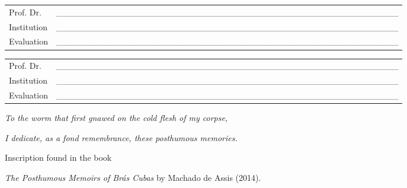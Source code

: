 \begin{folhadeaprovacao}
  \vspace*{0.5cm}

  \noindent
  \begin{tabular}{m{2cm} P{14cm}}
    Prof. Dr. & \_\_\_\_\_\_\_\_\_\_\_\_\_\_\_\_\_\_\_\_\_\_\_\_\_\_\_\_\_\_\_\_\_\_\_\_\_\_\_\_\_\_\_\_\_\_\_\_\_\_\_\_\_\_\_ \\
    Institution & \_\_\_\_\_\_\_\_\_\_\_\_\_\_\_\_\_\_\_\_\_\_\_\_\_\_\_\_\_\_\_\_\_\_\_\_\_\_\_\_\_\_\_\_\_\_\_\_\_\_\_\_\_\_\_ \\
    Evaluation & \_\_\_\_\_\_\_\_\_\_\_\_\_\_\_\_\_\_\_\_\_\_\_\_\_\_\_\_\_\_\_\_\_\_\_\_\_\_\_\_\_\_\_\_\_\_\_\_\_\_\_\_\_\_\_ \\
  \end{tabular}

  \vspace*{0.5cm}

  \noindent
  \begin{tabular}{m{2cm} P{14cm}}
    Prof. Dr. & \_\_\_\_\_\_\_\_\_\_\_\_\_\_\_\_\_\_\_\_\_\_\_\_\_\_\_\_\_\_\_\_\_\_\_\_\_\_\_\_\_\_\_\_\_\_\_\_\_\_\_\_\_\_\_ \\
    Institution & \_\_\_\_\_\_\_\_\_\_\_\_\_\_\_\_\_\_\_\_\_\_\_\_\_\_\_\_\_\_\_\_\_\_\_\_\_\_\_\_\_\_\_\_\_\_\_\_\_\_\_\_\_\_\_ \\
    Evaluation & \_\_\_\_\_\_\_\_\_\_\_\_\_\_\_\_\_\_\_\_\_\_\_\_\_\_\_\_\_\_\_\_\_\_\_\_\_\_\_\_\_\_\_\_\_\_\_\_\_\_\_\_\_\_\_ \\
  \end{tabular}
\end{folhadeaprovacao}


\begin{dedicatoria}
  \vspace*{\fill}
  \centering
\emph{To the worm that first gnawed on the cold flesh of my corpse,}

\emph{I dedicate, as a fond remembrance, these posthumous memories.}

\vspace{1cm}

Inscription found in the book

\emph{The Posthumous Memoirs of Brás Cubas} by Machado de Assis (2014).
	\vspace*{\fill}
\end{dedicatoria}

